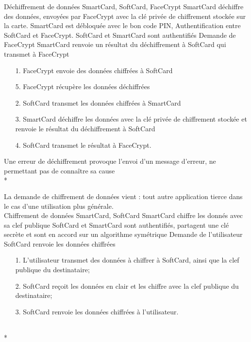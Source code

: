 \documentclass[a4paper,11pt,french]{article}
\begin{document}
\fiche
{Déchiffrement de données}
	{SmartCard, SoftCard, FaceCrypt}
    {SmartCard déchiffre des données, envoyées par FaceCrypt avec la clé privée
    de chiffrement stockée sur la carte.}
    {SmartCard est débloquée avec le bon code PIN, Authentification entre 
    SoftCard et FaceCrypt.  SoftCard et SmartCard sont authentifiés}
    {Demande de FaceCrypt}
    {SmartCard renvoie un résultat du déchiffrement à SoftCard qui transmet à 
    FaceCrypt}
    {\begin{itemize}
        \item[]        
        \item[1.] FaceCrypt envoie des données chiffrées à SoftCard
        \item[5.] FaceCrypt récupère les données déchiffrées
    \end{itemize}}
	{\begin{itemize}
        \item[]		
        \item[2.] SoftCard transmet les données chiffrées à SmartCard
	\item[3.] SmartCard déchiffre les données avec la clé privée de 
        chiffrement stockée et renvoie le résultat du déchiffrement à SoftCard
	\item[4.] SoftCard transmet le résultat à FaceCrypt.
	\end{itemize}
	}
	{}
\flots
    {}
    {Une erreur de déchiffrement provoque l'envoi d'un message d'erreur, ne
    permettant pas de connaître sa cause}
\\*

La demande de chiffrement de données vient :
tout autre application tierce dans le cas d'une utilisation plus générale.\\

\fiche
{Chiffrement de données}
	{SmartCard, SoftCard}
    {SmartCard chiffre les donnés avec sa clef publique}
    {SoftCard et SmartCard sont authentifiés, partagent une clé secrète et 
        sont en accord sur un algorithme symétrique}
    {Demande de l'utilisateur}
    {SoftCard renvoie les données chiffrées}
    {\begin{itemize}
        \item[]
        \item[1.] L'utilisateur transmet des données à chiffrer à SoftCard,
            ainsi que la clef publique du destinataire;
    \end{itemize}}
	{\begin{itemize}
        \item[]
        \item[2.] SoftCard reçoit les données en clair et les chiffre 
        avec la clef publique du destinataire;
		\item[3.] SoftCard renvoie les données chiffrées à l'utilisateur.
	\end{itemize}
	}
	{}
\flots
    {}
    {}
\\*
\end{document}
